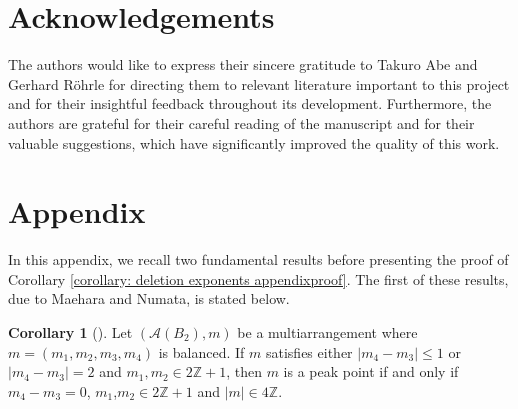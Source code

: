 \documentclass[12pt]{amsart}
\theoremstyle{definition}
\newtheorem{corollary}[theorem]{Corollary}
\theoremstyle{remark}
\newcommand\CA{{\mathscr A}}
\newcommand\ZZ{{\mathbb Z}}
\begin{document}
\section*{Acknowledgements}{The authors would like to express their sincere gratitude to Takuro Abe and Gerhard Röhrle for directing them to relevant literature important to this project and for their insightful feedback throughout its development. Furthermore, the authors are grateful for their careful reading of the manuscript and for their valuable suggestions, which have significantly improved the quality of this work.}

\section{Appendix}\label{appendix}
In this appendix, we recall two fundamental results before presenting the proof of Corollary \ref{corollary: deletion exponents appendixproof}. The first of these results, due to Maehara and Numata, is stated below.
\begin{corollary}[{\cite[Thm.~3.3,~Cor.~3.4]{2312.06356}}]\label{thm:main}
Let $(\CA(B_2),m)$ be a multiarrangement where $m=(m_1,m_2,m_3,m_4)$ is balanced. 
If $m$ satisfies either $|m_4-m_3|\leq 1$ or $|m_4-m_3|=2$ and $m_1,m_2\in2\ZZ+1$, then 
$m$ is a peak point if and only if $m_4-m_3=0$, $m_1$,$m_2\in 2\ZZ+1$ and $|m|\in 4\ZZ$. 
\end{corollary}
\end{document}
